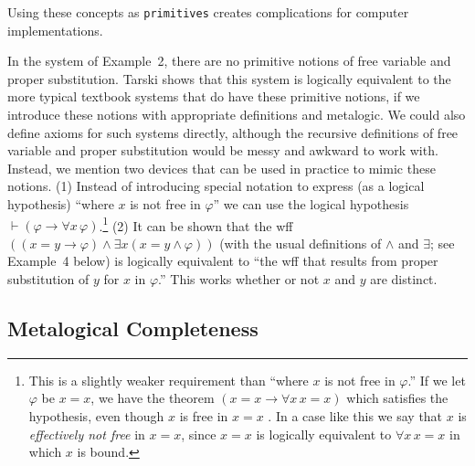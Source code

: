 Using these concepts as \texttt{primitives} creates complications
for computer implementations.

In the system of Example~2, there are no primitive notions of free variable
and proper substitution.  Tarski \cite{Tarski1965} shows that this system is
logically equivalent to the more typical textbook systems that do have these
primitive notions, if we introduce these notions with appropriate definitions
and metalogic.  We could also define axioms for such systems directly,
although the recursive definitions of free variable and proper substitution
would be messy and awkward to work with.  Instead, we mention two devices that
can be used in practice to mimic these notions.  (1) Instead of introducing
special notation to express (as a logical hypothesis) ``where $x$ is not free
in $\varphi$'' we can use the logical hypothesis $\vdash(\varphi\to\forall
x\,\varphi)$.\label{effectivelybound}\footnote{This is a slightly weaker requirement than ``where $x$ is
not free in $\varphi$.''  If we let $\varphi$ be $x=x$, we have the theorem
$(x=x\to\forall x\,x=x)$ which satisfies the hypothesis, even though $x$ is
free in $x=x$ .  In a case like this we say that $x$ is {\em effectively not
free} in $x=x$, since $x=x$ is logically
equivalent to $\forall x\,x=x$ in which $x$ is bound.} (2) It can be shown
that the wff $((x=y\to\varphi)\wedge\exists x(x=y\wedge\varphi))$ (with the
usual definitions of $\wedge$ and $\exists$; see Example~4 below) is logically
equivalent to ``the wff that results from proper substitution of $y$ for $x$
in $\varphi$.''  This works whether or not $x$ and $y$ are distinct.

\subsection{Metalogical Completeness}

